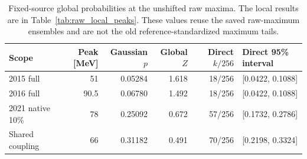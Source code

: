 \begin{table}[htbp]\centering\small
\begin{tabular}{lrrrrl}\toprule
Scope & Peak [MeV] & Gaussian $p$ & Global $Z$ & Direct $k/256$ & Direct 95\% interval\\\midrule
2015 full & 51 & 0.05284 & 1.618 & 18/256 & [0.0422, 0.1088] \\
2016 full & 90.5 & 0.06780 & 1.492 & 18/256 & [0.0422, 0.1088] \\
2021 native 10\% & 78 & 0.25092 & 0.672 & 57/256 & [0.1732, 0.2786] \\
Shared coupling & 66 & 0.31182 & 0.491 & 70/256 & [0.2198, 0.3324] \\
\bottomrule\end{tabular}
\caption{Fixed-source global probabilities at the unshifted raw maxima. The local results are in Table~\ref{tab:raw_local_peaks}. These values reuse the saved raw-maximum ensembles and are not the old reference-standardized maximum tails.}
\end{table}

